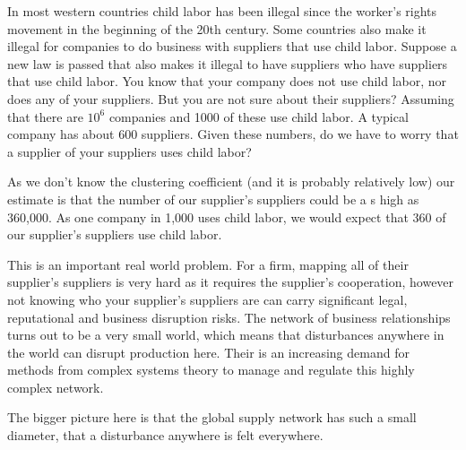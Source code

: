 
In most western countries child labor has been illegal since the worker's rights movement in the beginning of the 20th century. Some countries also make it illegal for companies to do business with suppliers that use child labor. Suppose a new law is passed that also makes it illegal to have suppliers who have suppliers that use child labor. You know that your company does not use child labor, nor does any of your suppliers. But you are not sure about their suppliers? Assuming that there are $10^6$ companies and 1000 of these use child labor. A typical company has about 600 suppliers. Given these numbers, do we have to worry that a supplier of your suppliers uses child labor?

\solution
As we don't know the clustering coefficient (and it is probably relatively low) our estimate is that the number of our supplier's suppliers could be a s high as 360,000. As one company in 1,000 uses child labor, we would expect that 360 of our supplier's suppliers use child labor. 

This is an important real world problem. For a firm, mapping all of their supplier's suppliers is very hard as it requires the supplier's cooperation, however not knowing who your supplier's suppliers are can carry significant legal, reputational and business disruption risks. The network of business relationships turns out to be a very small world, which means that disturbances anywhere in the world can disrupt production here. Their is an increasing demand for methods from complex systems theory to manage and regulate this highly complex network. 

The bigger picture here is that the global supply network has such a small diameter, that a disturbance anywhere is felt everywhere. 
